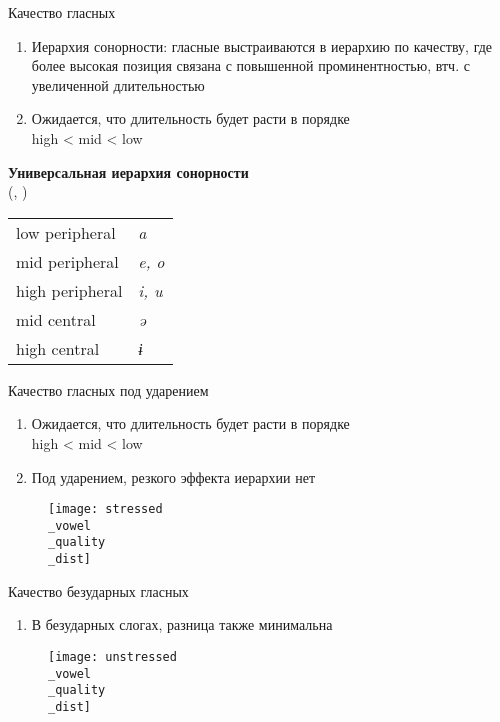\documentclass[10 pt, handout]{beamer}
\begin{document}
\begin{frame}[fragile]{Качество гласных}

	\begin{enumerate}[\ding{72}]
		\item Иерархия сонорности: гласные выстраиваются в иерархию по качеству, где более высокая позиция связана с повышенной проминентностью, втч. с увеличенной длительностью \parencite{kenstowicz1997, delacy2002, parker2002}
		\item Ожидается, что длительность будет расти в порядке\\ high < mid < low
	\end{enumerate}
	
	\ex\label{ex:son-hierarchy}
		\textbf{Универсальная иерархия сонорности} \\ (\cite[162]{kenstowicz1997}, \cite[55]{delacy2002})\\
		\vspace*{.5em}
\begin{table}[H]
\begin{tabular}{ll}
low peripheral  & \emph{a}    \\[.1em]
mid peripheral  & \emph{e, o} \\[.1em]
high peripheral & \emph{i, u} \\[.1em]
mid central     & \emph{ə}    \\[.1em]
high central    & \emph{ɨ}   
\end{tabular}
\end{table}	
	\xe	
	
\end{frame}

\begin{frame}{Качество гласных под ударением}

	\begin{enumerate}[\ding{167}]
		\item Ожидается, что длительность будет расти в порядке\\ high < mid < low
		\item Под ударением, резкого эффекта иерархии нет
	\end{enumerate}
	
	\begin{figure}[H]
		\texttt{[image: stressed\\\_vowel\\\_quality\\\_dist]}
	\end{figure}

\end{frame}

\begin{frame}{Качество безударных гласных}

	\begin{enumerate}[\ding{45}]
		\item В безударных слогах, разница также минимальна
	\end{enumerate}
	
	\begin{figure}[H]
		\texttt{[image: unstressed\\\_vowel\\\_quality\\\_dist]}
	\end{figure}

\end{frame}
\end{document}

